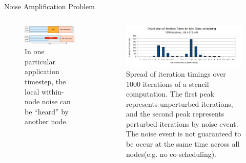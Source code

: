 \documentclass[serif,mathserif,final]{beamer}
\begin{document}
\begin{frame}{}
\begin{columns}[t]
\begin{column}{0.33\linewidth}
      \begin{block}{\small Noise Amplification Problem} 
       \begin{columns}[t]
         \begin{column}{0.5\columnwidth}
           \begin{figure}[htb]
             \centering
             \includegraphics[width=0.9\columnwidth]{images/static-schedule}
             \caption{ \tiny  In one particular application timestep, the 
               local within-node noise can be ``heard'' 
               by another node. } 
           \end{figure}
         \end{column}   
 
         \begin{column}{0.5\columnwidth}
           \begin{figure}[htb] 
             \centering 
             \includegraphics[width=0.9\columnwidth]{images/IterTimingsHisto-static}
             \caption 
                 {
                   \tiny Spread of iteration timings over 1000 iterations of a stencil computation. The first peak represents unperturbed iterations, 
                   and the second peak represents perturbed iterations by noise event. The noise event is not guaranteed to be occur at the same 
                   time across all nodes(e.g. no co-scheduling). 
                 } 
           \end{figure} 
         \end{column}
       \end{columns}
      \end{block} 


\end{column}
\end{columns}
\end{frame}
\end{document}
